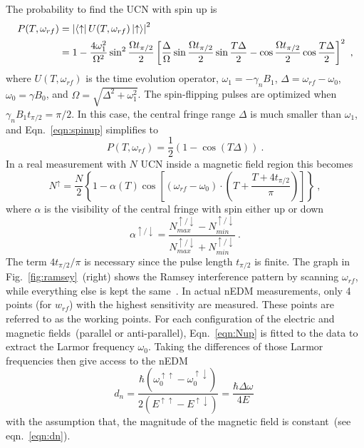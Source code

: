 The probability to find the UCN with spin up is
\begin{align}
  \label{eqn:spinup}
  P(T, \omega_{rf}) &= \left| \bra{\uparrow} U(T, \omega_{rf}) \ket{\uparrow}\right|^2 \\ \nonumber
  &= 1 - \frac{4 \omega_1^2}{\Omega^2} \sin ^2 \frac{\Omega t_{\pi/2}}{2} \left[ \frac{\Delta}{\Omega} \sin  \frac{\Omega t_{\pi/2}}{2} \sin \frac{T\Delta}{2} - \cos  \frac{\Omega t_{\pi/2}}{2} \cos\frac{T\Delta}{2} \right]^2~,
\end{align}
where $U(T, \omega_{rf})$ is the time evolution operator,
$\omega_1 = - \gamma_n B_1$, $\Delta = \omega_{rf} - \omega_0$,
$\omega_0 = \gamma B_0$, and $\Omega = \sqrt{\Delta^2 +
  \omega_1^2}$. The spin-flipping pulses are optimized when
$\gamma_n B_1 t_{\pi/2} = \pi / 2$. In this case, the central fringe
range $\Delta$ is much smaller than $\omega_1$, and
Eqn.~\ref{eqn:spinup} simplifies to
\begin{equation}
  P(T, \omega_{rf}) = \frac{1}{2} \left( 1 - \cos(T\Delta) \right)~.
\end{equation}
In a real measurement with $N$ UCN inside a magnetic field region this
becomes
\begin{equation}
  \label{eqn:Nup}
  N^{\uparrow} = \frac{N}{2} \left\lbrace 1 - \alpha(T) \cos \left[ (\omega_{rf} - \omega_0 ) \cdot \left(T+\frac{T+4t_{\pi/2}}{\pi}\right)\right]\right\rbrace~,
\end{equation}
where $\alpha$ is the visibility of the central fringe with spin
either up or down
\begin{equation}
  \label{eqn:visibility}
  \alpha^{\uparrow /\downarrow} = \frac{N_{max}^{\uparrow /\downarrow} - N_{min}^{\uparrow /\downarrow}}{N_{max}^{\uparrow /\downarrow}+ N_{min}^{\uparrow /\downarrow}}~.
\end{equation}
The term $4t_{\pi/2}/\pi$ is necessary since the pulse length
$t_{\pi/2}$ is finite. The graph in Fig.~\ref{fig:ramsey}~(right)
shows the Ramsey interference pattern by scanning $\omega_{rf}$, while
everything else is kept the same~\cite{Schmidt-Wellenburg:2016nfv}. In
actual nEDM measurements, only 4 points (for $w_{rf}$) with the
highest sensitivity are measured. These points are referred to as the
working points. For each configuration of the electric and magnetic
fields~(parallel or anti-parallel), Eqn.~\ref{eqn:Nup} is fitted to
the data to extract the Larmor frequency $\omega_0$. Taking the
differences of those Larmor frequencies then give access to the nEDM
\begin{equation}
  \label{eqn:fitteddn}
  d_n = \frac{\hbar (\omega_0 ^{\uparrow \uparrow} - \omega_0 ^{\uparrow \downarrow})}{2(E^{\uparrow \uparrow} - E^{\uparrow \downarrow})} = \frac{\hbar \Delta \omega}{4E}~
\end{equation}
with the assumption that, the magnitude of the magnetic field is
constant~(see eqn.~\ref{eqn:dn}).


